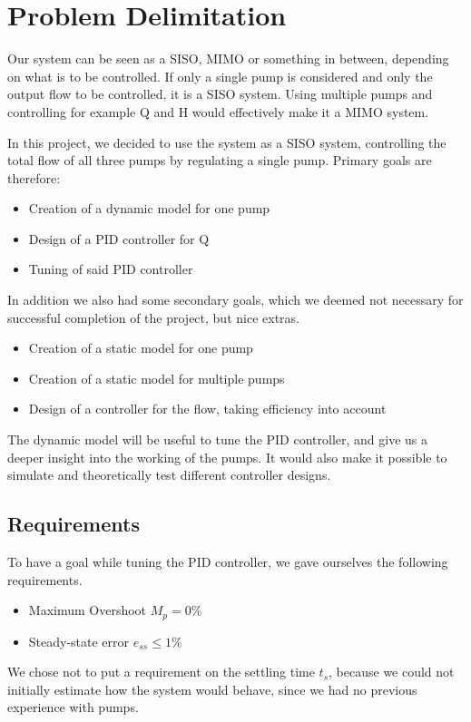 \section{Problem Delimitation}
Our system can be seen as a SISO, MIMO or something in between,
depending on what is to be controlled.
If only a single pump is considered and only the output flow to be controlled,
it is a SISO system.
Using multiple pumps and controlling for example Q and H would effectively make it a MIMO system.

In this project,
we decided to use the system as a SISO system,
controlling the total flow of all three pumps by regulating a single pump.
Primary goals are therefore:

\begin{itemize}
\item Creation of a dynamic model for one pump
\item Design of a PID controller for Q
\item Tuning of said PID controller 
\end{itemize}

In addition we also had some secondary goals,
which we deemed not necessary for successful completion of the project,
but nice extras.

\begin{itemize}
\item Creation of a static model for one pump
\item Creation of a static model for multiple pumps
\item Design of a controller for the flow, taking efficiency into account
\end{itemize}

The dynamic model will be useful to tune the PID controller,
and give us a deeper insight into the working of the pumps.
It would also make it possible to simulate and theoretically test different controller designs.


\subsection{Requirements}\label{sub:req}
To have a goal while tuning the PID controller,
we gave ourselves the following requirements.

\begin{itemize}
\item Maximum Overshoot $M_p = 0\%$
\item Steady-state error $e_{ss} \leq 1 \%$
\end{itemize}

We chose not to put a requirement on the settling time $t_s$,
because we could not initially estimate how the system would behave,
since we had no previous experience with pumps.